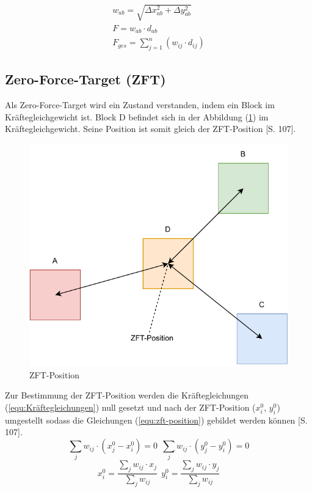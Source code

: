         \begin{align}
            \label{equ:euklid}
            w_{ab} = \sqrt{\Delta{}x_{ab}^2 + \Delta{}y_{ab}^2}\\
            \label{equ:force}
            F = w_{ab} \cdot d_{ab}\\
            \label{equ:force_sum}
            F_{ges} = \sum_{j=1}^{n} (w_{ij} \cdot d_{ij})
        \end{align}

        \subsection{Zero-Force-Target (ZFT)}
            Als Zero-Force-Target wird ein Zustand verstanden, indem ein Block im Kräftegleichgewicht ist.
            Block D befindet sich in der Abbildung (\ref{fig:zft-position}) im Kräftegleichgewicht.
            Seine Position ist somit gleich der ZFT-Position \cite{layout}[S. 107].
            \begin{figure}[H]
                \centering
                \includegraphics[scale=0.75]{img/zft.pdf}
                \caption{ZFT-Position}
                \label{fig:zft-position}
            \end{figure}
            Zur Bestimmung der ZFT-Position werden die Kräftegleichungen (\ref{equ:Kräftegleichungen})
            null gesetzt und nach der ZFT-Position ($x_i^0$, $y_i^0$) umgestellt sodass
            die Gleichungen (\ref{equ:zft-position}) gebildet werden können \cite{layout}[S. 107].
            \begin{equation}
                \label{equ:Kräftegleichungen}
                \sum_{j} w_{ij} \cdot (x_j^0-x_i^0) = 0~~
                \sum_{j} w_{ij} \cdot (y_j^0-y_i^0) = 0
            \end{equation}
            \begin{equation}
                \label{equ:zft-position}
                x_i^0 = \frac{\sum_{j} w_{ij} \cdot x_j}{\sum_{j} w_{ij}}~~
                y_i^0 = \frac{\sum_{j} w_{ij} \cdot y_j}{\sum_{j} w_{ij}}
            \end{equation}

